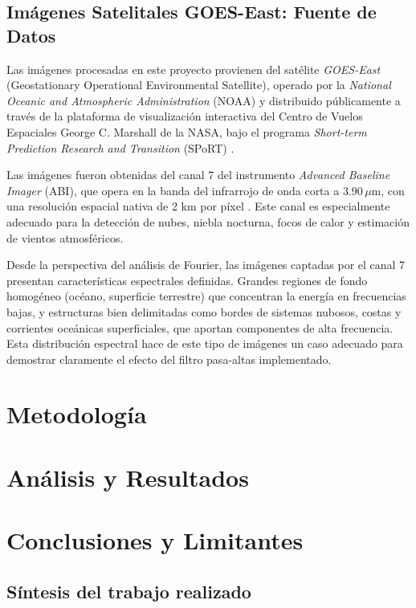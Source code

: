 \documentclass[conference]{IEEEtran}
\begin{document}
\subsection{Imágenes Satelitales GOES-East: Fuente de Datos}

Las imágenes procesadas en este proyecto provienen del satélite
\textit{GOES-East} (Geostationary Operational Environmental Satellite),
operado por la \textit{National Oceanic and Atmospheric Administration} (NOAA)
y distribuido públicamente a través de la plataforma de visualización
interactiva del Centro de Vuelos Espaciales George C. Marshall de la NASA, bajo
el programa \textit{Short-term Prediction Research and Transition} (SPoRT)
\cite{nasasport2026}.

Las imágenes fueron obtenidas del canal 7 del instrumento \textit{Advanced
Baseline Imager} (ABI), que opera en la banda del infrarrojo de onda corta a
$3.90\,\mu\text{m}$, con una resolución espacial nativa de 2 km por píxel
\cite{nasasport2026}. Este canal es especialmente adecuado para la detección de
nubes, niebla nocturna, focos de calor y estimación de vientos atmosféricos.

Desde la perspectiva del análisis de Fourier, las imágenes captadas por el canal 7 presentan características espectrales definidas. Grandes regiones de fondo homogéneo (océano, superficie terrestre) que concentran la energía en
frecuencias bajas, y estructuras bien delimitadas como bordes de sistemas
nubosos, costas y corrientes oceánicas superficiales, que aportan componentes
de alta frecuencia. Esta distribución espectral hace de este tipo de imágenes un caso adecuado para demostrar claramente el efecto del filtro pasa-altas implementado.

\section{Metodología}


\section{Análisis y Resultados}



\section{Conclusiones y Limitantes}

\subsection{Síntesis del trabajo realizado}
\end{document}
